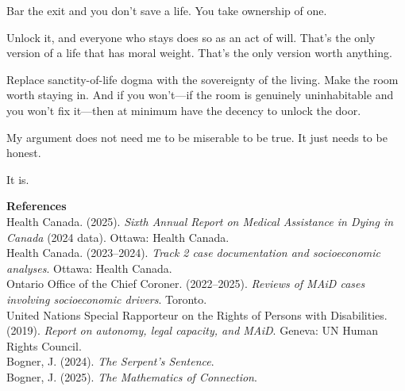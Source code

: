 \documentclass[10pt, letterpaper, twocolumn]{article}
\begin{document}
Bar the exit and you don't save a life. You take ownership of one.

Unlock it, and everyone who stays does so as an act of will. That's the only version of a life that has moral weight. That's the only version worth anything.

Replace sanctity-of-life dogma with the sovereignty of the living. Make the room worth staying in. And if you won't---if the room is genuinely uninhabitable and you won't fix it---then at minimum have the decency to unlock the door.

My argument does not need me to be miserable to be true. It just needs to be honest.

It is.

\bigskip
\begin{flushleft}
\textbf{References}\\[0.5em]
\small
Health Canada. (2025). \textit{Sixth Annual Report on Medical Assistance in Dying in Canada} (2024 data). Ottawa: Health Canada.\\[0.3em]
Health Canada. (2023--2024). \textit{Track 2 case documentation and socioeconomic analyses}. Ottawa: Health Canada.\\[0.3em]
Ontario Office of the Chief Coroner. (2022--2025). \textit{Reviews of MAiD cases involving socioeconomic drivers}. Toronto.\\[0.3em]
United Nations Special Rapporteur on the Rights of Persons with Disabilities. (2019). \textit{Report on autonomy, legal capacity, and MAiD}. Geneva: UN Human Rights Council.\\[0.3em]
Bogner, J. (2024). \textit{The Serpent's Sentence}.\\[0.3em]
Bogner, J. (2025). \textit{The Mathematics of Connection}.
\end{flushleft}
\end{document}
